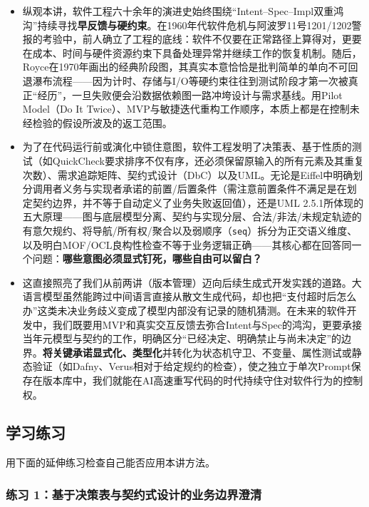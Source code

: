 \documentclass[UTF8,a4paper,11pt,fontset=fandol]{ctexart}
\begin{document}
\begin{itemize}
\item 纵观本讲，软件工程六十余年的演进史始终围绕“Intent–Spec–Impl双重鸿沟”持续寻找\textbf{早反馈与硬约束}。在1960年代软件危机与阿波罗11号1201/1202警报的考验中，前人确立了工程的底线：软件不仅要在正常路径上算得对，更要在成本、时间与硬件资源约束下具备处理异常并继续工作的恢复机制。随后，Royce在1970年画出的经典阶段图，其真实本意恰恰是批判简单的单向不可回退瀑布流程——因为计时、存储与I/O等硬约束往往到测试阶段才第一次被真正“经历”，一旦失败便会沿数据依赖图一路冲垮设计与需求基线。用Pilot Model（Do It Twice）、MVP与敏捷迭代重构工作顺序，本质上都是在控制未经检验的假设所波及的返工范围。



\item 为了在代码运行前或演化中锁住意图，软件工程发明了决策表、基于性质的测试（如QuickCheck要求排序不仅有序，还必须保留原输入的所有元素及其重复次数）、需求追踪矩阵、契约式设计（DbC）以及UML。无论是Eiffel中明确划分调用者义务与实现者承诺的前置/后置条件（需注意前置条件不满足是在划定契约边界，并不等于自动定义了业务失败返回值），还是UML 2.5.1所体现的五大原理——图与底层模型分离、契约与实现分层、合法/非法/未规定轨迹的有意欠规约、将导航/所有权/聚合以及弱顺序（\texttt{seq}）拆分为正交语义维度、以及明白MOF/OCL良构性检查不等于业务逻辑正确——其核心都在回答同一个问题：\textbf{哪些意图必须显式钉死，哪些自由可以留白？}



\item 这直接照亮了我们从前两讲（版本管理）迈向后续生成式开发实践的道路。大语言模型虽然能跨过中间语言直接从散文生成代码，却也把“支付超时后怎么办”这类未决业务歧义变成了模型内部没有记录的随机猜测。在未来的软件开发中，我们既要用MVP和真实交互反馈去弥合Intent与Spec的鸿沟，更要承接当年元模型与契约的工作，明确区分“已经决定、明确禁止与尚未决定”的边界。\textbf{将关键承诺显式化、类型化}并转化为状态机守卫、不变量、属性测试或静态验证（如Dafny、Verus相对于给定规约的检查），使之独立于单次Prompt保存在版本库中，我们就能在AI高速重写代码的时代持续守住对软件行为的控制权。
\end{itemize}

\subsection{学习练习}

用下面的延伸练习检查自己能否应用本讲方法。

\subsubsection*{练习 1：基于决策表与契约式设计的业务边界澄清}
\end{document}
